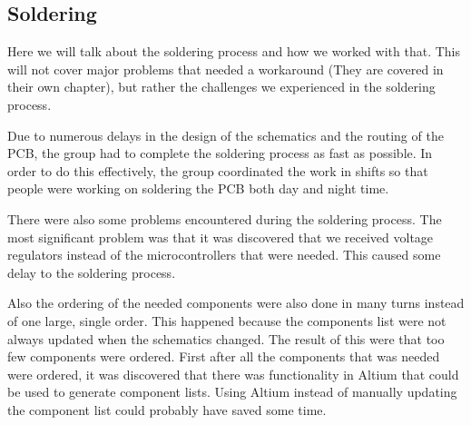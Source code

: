 \subsection{Soldering} \label{pcb:process:ss:soldering}

Here we will talk about the soldering process and how we worked with that.
This will not cover major problems that needed a workaround (They are covered in their own chapter), but rather the challenges we experienced in the soldering process.

Due to numerous delays in the design of the schematics and the routing of the PCB, the group had to complete the soldering process as fast as possible.
In order to do this effectively, the group coordinated the work in shifts so that people were working on soldering the PCB both day and night time.

There were also some problems encountered during the soldering process. The most significant problem was that it was discovered that
we received voltage regulators instead of the microcontrollers that were needed. This caused some delay to the soldering process.

Also the ordering of the needed components were also done in many turns instead of one large, single order.
This happened because the components list were not always updated when the schematics changed. The result of this were
that too few components were ordered. First after all the components that was needed were ordered, it was discovered that there was functionality in Altium that could be used
to generate component lists. Using Altium instead of manually updating the component list could probably have saved some time.

